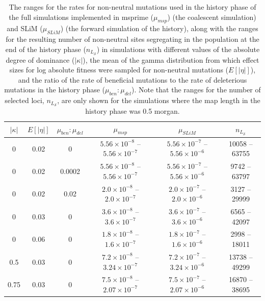 \documentclass[12pt]{article}
\begin{document}
\begin{bibunit}
\begin{table}[H]
    \centering
    \begin{tabular}{|c|c|c|c|c|c|}
    \hline
        $|\kappa|$&$E[|\eta|]$&$\mu_{ben}:\mu_{del}$ &\textbf{$\mu_{msp}$}  &\textbf{$\mu_{SLiM}$}  & $n_{L_\mathcal{S}}$\\
        \hline
        0&0.02& 0 & $5.56\times10^{-8}$ -- $5.56\times10^{-7}$ &$5.56\times10^{-7}$ --  $5.56\times10^{-6}$  & 10058  -- 63755\\
        0&0.02& 0.0002 & $5.56\times10^{-8}$ --  $5.56\times10^{-7}$ & $5.56\times10^{-7}$ -- $5.56\times10^{-6}$ & 9742 -- 63797\\
         0&0.02& 0.02  & $2.0\times10^{-8}$ -- $2.0\times10^{-7}$ & $2.0\times10^{-7}$ -- $2.0\times10^{-6}$ & 3127 --  29999\\
         0&0.03& 0 & $3.6\times10^{-8}$ --  $3.6\times10^{-7}$ & $3.6\times10^{-7}$ --  $3.6\times10^{-6}$ & 6565 --  42097\\
         0&0.06& 0 & $1.8\times10^{-8}$ -- $1.6\times10^{-7}$ & $1.8\times10^{-7}$ -- $1.6\times10^{-6}$ & 2998 --  18011 \\
         0.5&0.03&0&$7.2\times10^{-8}$ -- $3.24\times10^{-7}$&$7.2\times10^{-7}$ -- $3.24\times10^{-6}$&13738 -- 49299\\
         0.75&0.03&0&$7.5\times10^{-8}$ -- $2.07\times10^{-7}$&$7.5\times10^{-7}$ -- $2.07\times10^{-6}$&16870 -- 38695\\
         \hline
    \end{tabular}
    \caption{The ranges for the rates for non-neutral mutations used in the history phase of the full simulations implemented in msprime ($\mu_{msp}$) (the coalescent simulation) and SLiM ($\mu_{SLiM}$) (the forward simulation of the history), along with the ranges for the resulting number of non-neutral sites segregating in the population at the end of the history phase ($n_{L_\mathcal{S}}$) in simulations with different values of the absolute degree of dominance ($|\kappa|$), the mean of the gamma distribution from which effect sizes for log absolute fitness were sampled for non-neutral mutations ($E[|\eta|]$), and the ratio of the rate of beneficial mutations to the rate of deleterious mutations in the history phase ($\mu_{ben}:\mu_{del}$). Note that the ranges for the number of selected loci, $n_{L_\mathcal{S}}$, are only shown for the simulations where the map length in the history phase was 0.5 morgan.}
    \label{tab:sim_params}
\end{table}


\end{bibunit}
\end{document}

